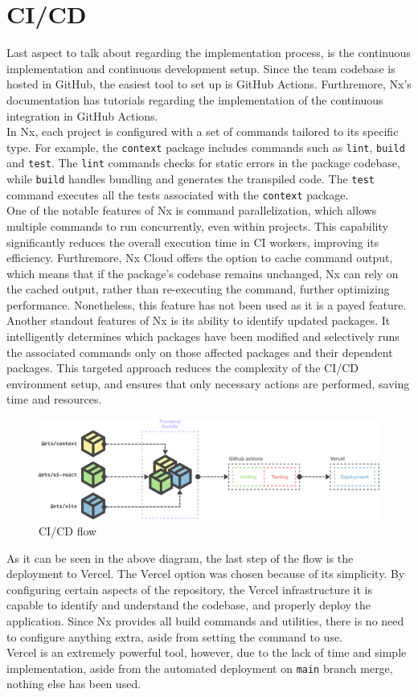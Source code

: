 \documentclass[./memory.tex]{subfiles}
\begin{document}
\section{CI/CD}
Last aspect to talk about regarding the implementation process, is the
continuous implementation and continuous development setup. Since the team
codebase is hosted in GitHub, the easiest tool to set up is GitHub Actions.
Furthremore, Nx's documentation has tutorials\cite{nx-github-actions} regarding
the implementation of the continuous integration in GitHub Actions.
\\[8pt]
In Nx, each project is configured with a set of commands tailored to its
specific type. For example, the \texttt{context} package includes commands such
as \texttt{lint}, \texttt{build} and \texttt{test}. The \texttt{lint} commands
checks for static errors in the package codebase, while \texttt{build} handles
bundling and generates the transpiled code. The \texttt{test} command executes
all the tests associated with the \texttt{context} package.
\\
One of the notable features of Nx is command parallelization, which allows
multiple commands to run concurrently, even within projects. This capability
significantly reduces the overall execution time in CI workers, improving its
efficiency. Furthremore, Nx Cloud offers the option to cache command output,
which means that if the package's codebase remains unchanged, Nx can rely on the
cached output, rather than re-executing the command, further optimizing
performance. Nonetheless, this feature has not been used as it is a payed
feature.
\\
Another standout features of Nx is its ability to identify updated packages. It
intelligently determines which packages have been modified and selectively runs
the associated commands only on those affected packages and their dependent
packages. This targeted approach reduces the complexity of the CI/CD
environment setup, and ensures that only necessary actions are performed, saving
time and resources.
\begin{figure}[H]
	\centering
	\includegraphics[width=\textwidth]{./assets/deployment.png}
	\caption{CI/CD flow}
\end{figure}
As it can be seen in the above diagram, the last step of the flow is the
deployment to Vercel. The Vercel option was chosen because of its simplicity. By
configuring certain aspects of the repository, the Vercel infrastructure it is
capable to identify and understand the codebase, and properly deploy the
application. Since Nx provides all build commands and utilities, there is no
need to configure anything extra, aside from setting the command to use.
\\
Vercel is an extremely powerful tool, however, due to the lack of time and
simple implementation, aside from the automated deployment on \texttt{main}
branch merge, nothing else has been used.
\end{document}
